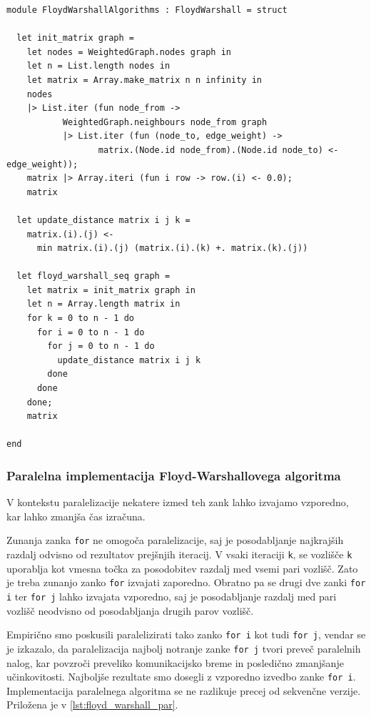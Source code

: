 \documentclass[mat1, tisk]{fmfdelo}
\begin{document}
\begin{lstlisting}[label=lst:floyd_warshall_seq]
module FloydWarshallAlgorithms : FloydWarshall = struct

  let init_matrix graph =
    let nodes = WeightedGraph.nodes graph in
    let n = List.length nodes in
    let matrix = Array.make_matrix n n infinity in
    nodes
    |> List.iter (fun node_from ->
           WeightedGraph.neighbours node_from graph
           |> List.iter (fun (node_to, edge_weight) ->
                  matrix.(Node.id node_from).(Node.id node_to) <- edge_weight));
    matrix |> Array.iteri (fun i row -> row.(i) <- 0.0);
    matrix
  
  let update_distance matrix i j k =
    matrix.(i).(j) <- 
      min matrix.(i).(j) (matrix.(i).(k) +. matrix.(k).(j))

  let floyd_warshall_seq graph =
    let matrix = init_matrix graph in
    let n = Array.length matrix in
    for k = 0 to n - 1 do
      for i = 0 to n - 1 do
        for j = 0 to n - 1 do
          update_distance matrix i j k
        done
      done
    done;
    matrix

end
\end{lstlisting}


\subsubsection{Paralelna implementacija Floyd-Warshallovega algoritma}

V kontekstu paralelizacije nekatere izmed teh zank lahko izvajamo vzporedno, kar lahko zmanjša čas izračuna.

Zunanja zanka \texttt{for} ne omogoča paralelizacije, saj je posodabljanje najkrajših razdalj odvisno od rezultatov
prejšnjih iteracij. V vsaki iteraciji \texttt{k}, se vozlišče \texttt{k} uporablja kot vmesna točka za posodobitev
razdalj med vsemi pari vozlišč. Zato je treba zunanjo zanko \texttt{for} izvajati zaporedno.
Obratno pa se drugi dve zanki \texttt{for i} ter \texttt{for j} lahko izvajata vzporedno, saj je posodabljanje razdalj med pari vozlišč
neodvisno od posodabljanja drugih parov vozlišč.

Empirično smo poskusili paralelizirati tako zanko \texttt{for i} kot tudi \texttt{for j}, vendar se je izkazalo, da paralelizacija najbolj
notranje zanke \texttt{for j} tvori preveč paralelnih nalog, kar povzroči preveliko komunikacijsko breme in posledično
zmanjšanje učinkovitosti. Najboljše rezultate smo dosegli z vzporedno izvedbo zanke \texttt{for i}.
Implementacija paralelnega algoritma se ne razlikuje precej od sekvenčne verzije. Priložena je v \ref{lst:floyd_warshall_par}.
\end{document}

